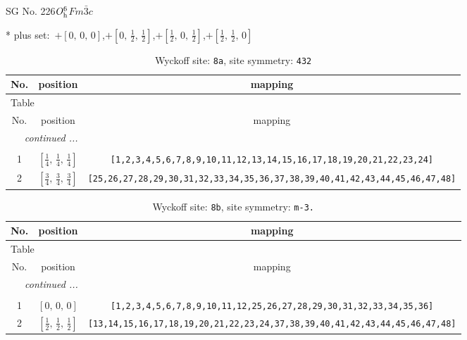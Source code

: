 \documentclass[fleqn,8pt]{jsarticle}
\begin{document}
\setcounter{MaxMatrixCols}{32}

\renewcommand{\tablename}{Table~}
\renewcommand{\figurename}{Figure~}
\begin{center}
\LARGE
SG No. 226\quad$O_{\rm h}^{6}$\quad$Fm\bar{3}c$\quad[ cubic ]
\end{center}
* plus set:\,\,\,$+\left[ 0,\, 0,\, 0 \right]$,\quad $+\left[ 0,\, \frac{1}{2},\, \frac{1}{2} \right]$,\quad $+\left[ \frac{1}{2},\, 0,\, \frac{1}{2} \right]$,\quad $+\left[ \frac{1}{2},\, \frac{1}{2},\, 0 \right]$
\renewcommand{\arraystretch}{1.2}
\begin{longtable}{ccc}
\caption{Wyckoff site: {\tt 8a}, site symmetry: {\tt 432}}
 \\
 \hline \hline
No. & position & mapping \\ \hline \endfirsthead

\multicolumn{2}{l}{\tablename\ \thetable{}} \\
 \hline \hline
No. & position & mapping \\ \hline \endhead

 \hline \hline
\multicolumn{2}{r}{\footnotesize\it continued ...} \\ \endfoot

 \hline \hline
\multicolumn{2}{r}{} \\ \endlastfoot

1 & $\left[ \frac{1}{4},\, \frac{1}{4},\, \frac{1}{4} \right]$ & {\tt [1,2,3,4,5,6,7,8,9,10,11,12,13,14,15,16,17,18,19,20,21,22,23,24]} \\ \hline
2 & $\left[ \frac{3}{4},\, \frac{3}{4},\, \frac{3}{4} \right]$ & {\tt [25,26,27,28,29,30,31,32,33,34,35,36,37,38,39,40,41,42,43,44,45,46,47,48]} \\
\end{longtable}
\renewcommand{\arraystretch}{1.2}
\begin{longtable}{ccc}
\caption{Wyckoff site: {\tt 8b}, site symmetry: {\tt m-3.}}
 \\
 \hline \hline
No. & position & mapping \\ \hline \endfirsthead

\multicolumn{2}{l}{\tablename\ \thetable{}} \\
 \hline \hline
No. & position & mapping \\ \hline \endhead

 \hline \hline
\multicolumn{2}{r}{\footnotesize\it continued ...} \\ \endfoot

 \hline \hline
\multicolumn{2}{r}{} \\ \endlastfoot

1 & $\left[ 0,\, 0,\, 0 \right]$ & {\tt [1,2,3,4,5,6,7,8,9,10,11,12,25,26,27,28,29,30,31,32,33,34,35,36]} \\ \hline
2 & $\left[ \frac{1}{2},\, \frac{1}{2},\, \frac{1}{2} \right]$ & {\tt [13,14,15,16,17,18,19,20,21,22,23,24,37,38,39,40,41,42,43,44,45,46,47,48]} \\
\end{longtable}
\end{document}
